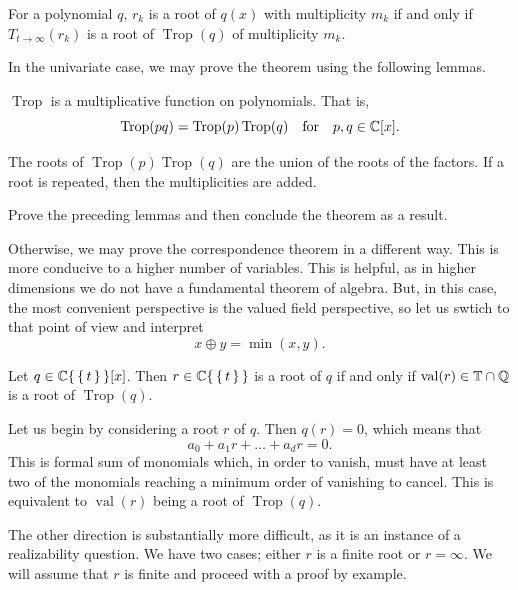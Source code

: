 \documentclass[12pt]{memoir}
\DeclareMathOperator{\val}{val}
\DeclareMathOperator{\Trop}{Trop}
\theoremstyle{definition}
\begin{document}
\begin{Th}
For a polynomial $q$, $r_k$ is a root of $q(x)$ with multiplicity $m_k$ if and only if $T_{t\to\infty}(r_k)$ is a root of $\Trop(q)$ of multiplicity $m_k$.
\end{Th}

In the univariate case, we may prove the theorem using the following lemmas.

\begin{Lem}
$\Trop$ is a multiplicative function on polynomials. That is,
$$\Trop(pq)=\Trop(p)\Trop(q)\word{for}p,q\in\bC[x].$$
\end{Lem}

\begin{Lem}
The roots of $\Trop(p)\Trop(q)$ are the union of the roots of the factors. If a root is repeated, then the multiplicities are added.
\end{Lem}

\begin{Ej}
Prove the preceding lemmas and then conclude the theorem as a result.
\end{Ej}

Otherwise, we may prove the correspondence theorem in a different way. This is more conducive to a higher number of variables. This is helpful, as in higher dimensions we do not have a fundamental theorem of algebra. But, in this case, the most convenient perspective is the valued field perspective, so let us swtich to that point of view and interpret 
$$x\oplus y=\min(x,y).$$

\begin{Th}
Let $q\in\mathbb{C}\{\,\{\,t\,\}\,\}[x]$. Then $r\in\mathbb{C}\{\,\{\,t\,\}\,\}$ is a root of $q$ if and only if $\val(r)\in\bT\cap\bQ$ is a root of $\Trop(q)$.
\end{Th}

\begin{ptcbp}
Let us begin by considering a root $r$ of $q$. Then $q(r)=0$, which means that 
$$a_0+a_1r+\dots+a_dr=0.$$
This is formal sum of monomials which, in order to vanish, must have at least two of the monomials reaching a minimum order of vanishing to cancel. This is equivalent to $\val(r)$ being a root of $\Trop(q)$. \par %
The other direction is substantially more difficult, as it is an instance of a realizability question. We have two cases; either $r$ is a finite root or $r=\infty$. We will assume that $r$ is finite and proceed with a proof by example. 
\end{ptcbp}
\end{document}
